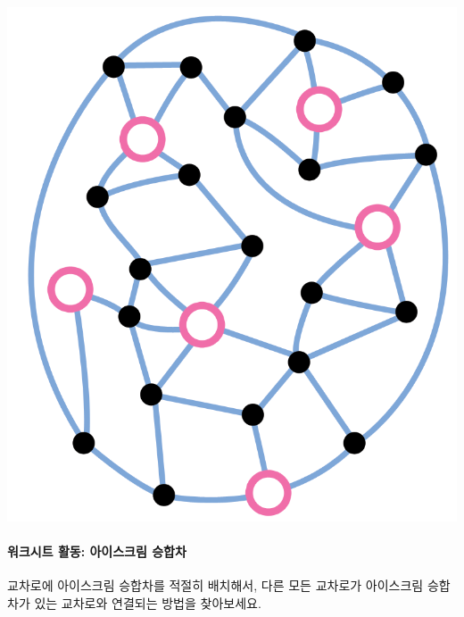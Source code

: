 \documentclass[]{article}
\begin{document}
\includegraphics{csunplugged/04-part/img/ch15-dominating-sets/14-dominating-sets-02-vans-route.png}

\mbox{}\paragraph{워크시트 활동: 아이스크림 승합차}\label{section-205}

교차로에 아이스크림 승합차를 적절히 배치해서, 다른 모든 교차로가
아이스크림 승합차가 있는 교차로와 연결되는 방법을 찾아보세요.
\end{document}
